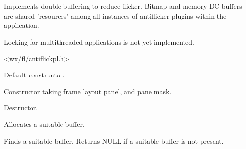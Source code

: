 %
%


\section{}\label{cbantiflickerplugin}


Implements double-buffering to reduce flicker.
Bitmap and memory DC buffers are shared 'resources' among all instances of
antiflicker plugins within the application.

Locking for multithreaded applications is not yet implemented.




<wx/fl/antiflickpl.h>




\label{cbantiflickerplugincbantiflickerplugin}


Default constructor.



Constructor taking frame layout panel, and pane mask.


\label{cbantiflickerplugindtor}


Destructor.


\label{cbantiflickerpluginallocnewbuffer}


Allocates a suitable buffer.


\label{cbantiflickerpluginfindsuitablebuffer}


Finds a suitable buffer. Returns NULL if a suitable buffer is not present.


